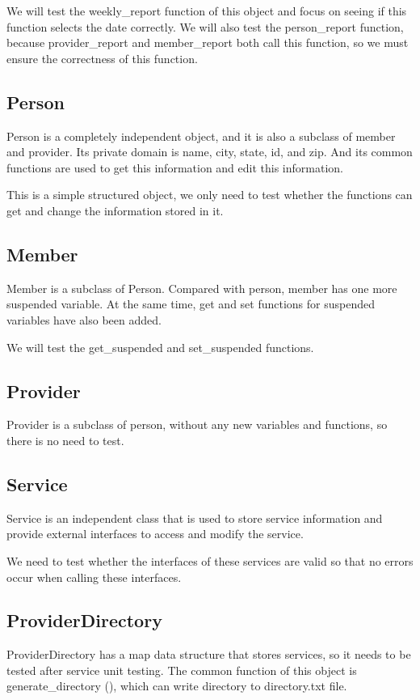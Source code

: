 \documentclass{article}
\begin{document}
We will test the weekly_report function of this object and focus on seeing if
this function selects the date correctly. We will also test the person_report
function, because provider_report and member_report both call this
function, so we must ensure the correctness of this function.


\subsection{Person}

Person is a completely independent object, and it is also a subclass of
member and provider. Its private domain is name, city, state, id, and zip.
And its common functions are used to get this information and edit this
information.

This is a simple structured object, we only need to test whether the
functions can get and change the information stored in it.

\subsection{Member}
Member is a subclass of Person. Compared with person, member has one
more suspended variable. At the same time, get and set functions for
suspended variables have also been added.

We will test the get_suspended and set_suspended functions.

\subsection{Provider}
Provider is a subclass of person, without any new variables and functions,
so there is no need to test.

\subsection{Service}
Service is an independent class that is used to store service information
and provide external interfaces to access and modify the service.

We need to test whether the interfaces of these services are valid so that
no errors occur when calling these interfaces.

\subsection{ProviderDirectory}

ProviderDirectory has a map data structure that stores services, so it
needs to be tested after service unit testing. The common function of this
object is generate_directory (), which can write directory to directory.txt
file.
\end{document}

